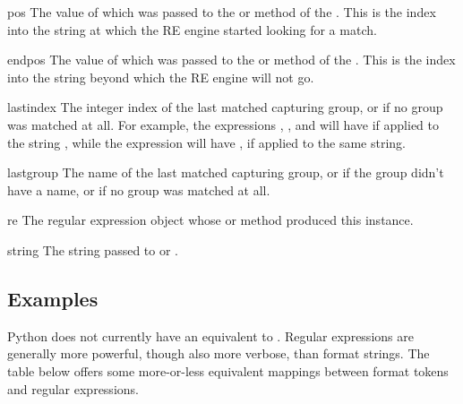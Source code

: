 \begin{memberdesc}[MatchObject]{pos}
The value of  which was passed to the  or
 method of the .  This is the
index into the string at which the RE engine started looking for a
match.
\end{memberdesc}

\begin{memberdesc}[MatchObject]{endpos}
The value of  which was passed to the 
or  method of the .  This is the
index into the string beyond which the RE engine will not go.
\end{memberdesc}

\begin{memberdesc}[MatchObject]{lastindex}
The integer index of the last matched capturing group, or 
if no group was matched at all. For example, the expressions
, , and  will have
 if applied to the string ,
while the expression  will have ,
if applied to the same string.
\end{memberdesc}

\begin{memberdesc}[MatchObject]{lastgroup}
The name of the last matched capturing group, or  if the
group didn't have a name, or if no group was matched at all.
\end{memberdesc}

\begin{memberdesc}[MatchObject]{re}
The regular expression object whose  or
 method produced this  instance.
\end{memberdesc}

\begin{memberdesc}[MatchObject]{string}
The string passed to  or .
\end{memberdesc}

\subsection{Examples}


Python does not currently have an equivalent to .
Regular expressions are generally more powerful, though also more
verbose, than  format strings.  The table below
offers some more-or-less equivalent mappings between
 format tokens and regular expressions.

